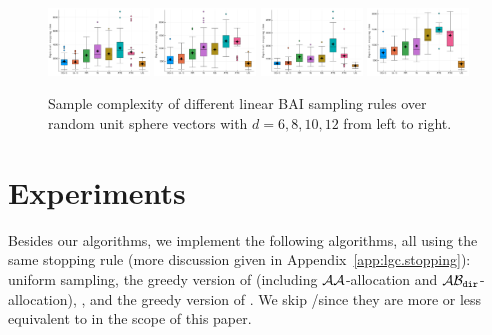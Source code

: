 \begin{figure}[t!]
 \centering
 \includegraphics[clip, width= 0.24\textwidth]{Chapter4/img/bai_dim_6}
 \includegraphics[clip, width= 0.24\textwidth]{Chapter4/img/bai_dim_8}
 \includegraphics[clip, width= 0.24\textwidth]{Chapter4/img/bai_dim_10}
 \includegraphics[clip, width= 0.24\textwidth]{Chapter4/img/bai_dim_12}
 \caption{Sample complexity of different linear BAI sampling rules over random unit sphere vectors with $d=6, 8, 10, 12$ from left to right.}
 \label{fig:sample_complexity_2}
\end{figure}

\section{Experiments}\label{sec:lgc.experiments}
Besides our algorithms, we implement the following algorithms, all using the same stopping rule (more discussion given in Appendix~\ref{app:lgc.stopping}): uniform sampling, the greedy version of \XYS (including $\mathcal{A}\mathcal{A}$-allocation and $\mathcal{A}\mathcal{B}_{\texttt{dir}}$-allocation), \XYA, and the greedy version of \LGapE. We skip \GLUCB/\GLGapE since they are more or less equivalent to \LGapE in the scope of this paper.
\vspace{-0.3cm}
